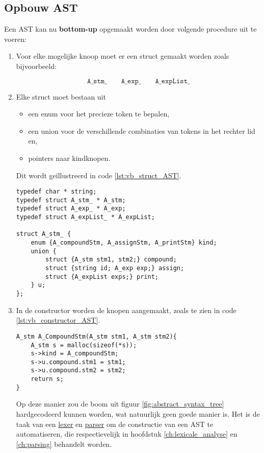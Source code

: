 \subsection{Opbouw AST}
Een AST kan nu \textbf{bottom-up} opgemaakt worden door volgende procedure uit te voeren:
\begin{enumerate}
	\item Voor elke mogelijke knoop moet er een struct gemaakt worden zoals bijvoorbeeld:
	
	$$\texttt{A\_stm\_} \qquad \texttt{A\_exp\_} \qquad \texttt{A\_expList\_}$$
	
	\item Elke struct moet bestaan uit
	\begin{itemize}
		\item een enum voor het precieze token te bepalen,
		\item een union voor de verschillende combinaties van tokens in het rechter lid en,
		\item pointers naar kindknopen.
	\end{itemize}
	Dit wordt geïllustreerd in code \ref{lst:vb_struct_AST}.
	\begin{lstlisting}[caption={Voorbeeld van een struct voor een AST.},label={lst:vb_struct_AST}, captionpos=b]
typedef char * string;
typedef struct A_stm_ * A_stm;
typedef struct A_exp_ * A_exp;
typedef struct A_expList_ * A_expList;

struct A_stm_ {
	enum {A_compoundStm, A_assignStm, A_printStm} kind;
	union {
		struct {A_stm stm1, stm2;} compound;
		struct {string id; A_exp exp;} assign;
		struct {A_expList exps;} print;
	} u;
};
	\end{lstlisting}
	\item In de constructor worden de knopen aangemaakt, zoals te zien in code \ref{lst:vb_constructor_AST}.
	\begin{lstlisting}[caption={Voorbeeld van een constructor voor een AST.},label={lst:vb_constructor_AST}, captionpos=b]
A_stm A_CompoundStm(A_stm stm1, A_stm stm2){
	A_stm s = malloc(sizeof(*s));
	s->kind = A_compoundStm;
	s->u.compound.stm1 = stm1;
	s->u.compound.stm2 = stm2;
	return s;
}
	\end{lstlisting}
	
Op deze manier zou de boom uit figuur \ref{fig:abstract_syntax_tree} hardgecodeerd kunnen worden, wat natuurlijk geen goede manier is. Het is de taak van een \uline{lexer} en \uline{parser} om de constructie van een AST te automatiseren, die respectievelijk in hoofdstuk \ref{ch:lexicale_analyse} en \ref{ch:parsing} behandelt worden.


\end{enumerate}
